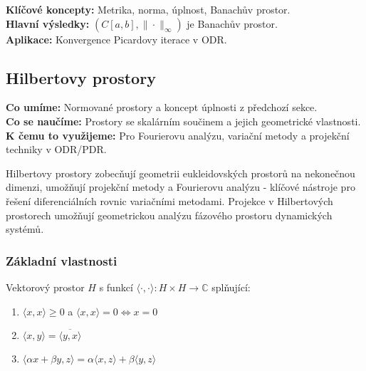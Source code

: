 \begin{summary}
\textbf{Klíčové koncepty:} Metrika, norma, úplnost, Banachův prostor. \\
\textbf{Hlavní výsledky:} $(C[a,b], \|\cdot\|_\infty)$ je Banachův prostor. \\
\textbf{Aplikace:} Konvergence Picardovy iterace v ODR.
\end{summary}

\spc

\subsection{Hilbertovy prostory}

\begin{scaffold}
\textbf{Co umíme:} Normované prostory a koncept úplnosti z předchozí sekce. \\
\textbf{Co se naučíme:} Prostory se skalárním součinem a jejich geometrické vlastnosti. \\
\textbf{K čemu to využijeme:} Pro Fourierovu analýzu, variační metody a projekční techniky v ODR/PDR.
\end{scaffold}

\begin{motivation}
Hilbertovy prostory zobecňují geometrii eukleidovských prostorů na nekonečnou dimenzi, umožňují projekční metody a Fourierovu analýzu - klíčové nástroje pro řešení diferenciálních rovnic variačními metodami. Projekce v Hilbertových prostorech umožňují geometrickou analýzu fázového prostoru dynamických systémů.
\end{motivation}

\subsubsection{Základní vlastnosti}

\begin{definition}
Vektorový prostor $H$ s funkcí $\langle\cdot,\cdot\rangle: H \times H \to \mathbb{C}$ splňující:
\begin{enumerate}
\item $\langle x,x \rangle \geq 0$ a $\langle x,x \rangle = 0 \Leftrightarrow x = 0$
\item $\langle x,y \rangle = \overline{\langle y,x \rangle}$
\item $\langle \alpha x + \beta y, z \rangle = \alpha \langle x,z \rangle + \beta \langle y,z \rangle$
\end{enumerate}
\end{definition}

